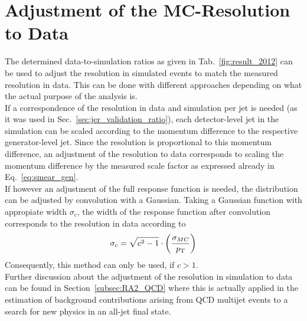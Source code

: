 \section{Adjustment of the MC-Resolution to Data}
\label{sec:jer_adjustment}
The determined data-to-simulation ratios as given in Tab.~\ref{fig:result_2012} can be used to adjust the resolution in simulated events to match the measured resolution in data. This can be done with different approaches depending on what the actual purpose of the analysis is. \\
If a correspondence of the resolution in data and simulation per jet is needed (as it was used in Sec.~\ref{sec:jer_validation_ratio}), each detector-level jet in the simulation can be scaled according to the momentum difference to the respective generator-level jet. Since the resolution is proportional to this momentum difference, an adjustment of the resolution to data corresponds to scaling the momentum difference by the measured scale factor as expressed already in Eq.~\ref{eq:smear_gen}. \\
If however an adjustment of the full response function is needed, the distribution can be adjusted by convolution with a Gaussian. Taking a Gaussian function with appropiate width $\sigma_{c}$, the width of the response function after convolution corresponds to the resolution in data according to 
\begin{equation}
\sigma_{c} = \sqrt{c^2-1} \cdot \left( \frac{\sigma_{MC}}{p_{\text{T}}} \right)
\end{equation}
Consequently, this method can only be used, if $c > 1$. \\
Further discussion about the adjustment of the resolution in simulation to data can be found in Section~\ref{subsec:RA2_QCD} where this is actually applied in the estimation of background contributions arising from QCD multijet events to a search for new physics in an all-jet final state.  













